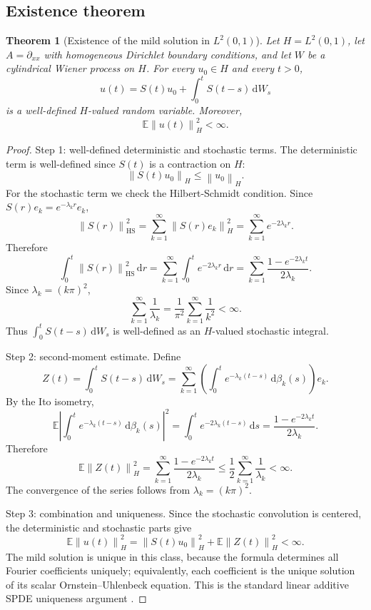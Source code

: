 \documentclass[11pt,a4paper]{article}
\newtheorem{theorem}{Theorem}[section]
\newcommand{\E}{\mathbb{E}}
\newcommand{\dd}{\,\mathrm{d}}
\newcommand{\HS}{\mathrm{HS}}
\newcommand{\norm}[1]{\left\lVert #1 \right\rVert}
\begin{document}
\subsection{Existence theorem}

\begin{theorem}[Existence of the mild solution in \(L^2(0,1)\)]
Let \(H=L^2(0,1)\), let \(A=\partial_{xx}\) with homogeneous Dirichlet boundary
conditions, and let \(W\) be a cylindrical Wiener process on \(H\). For every
\(u_0\in H\) and every \(t>0\),
\[
  u(t)=S(t)u_0+\int_0^t S(t-s)\dd W_s
\]
is a well-defined \(H\)-valued random variable. Moreover,
\[
  \E\norm{u(t)}_H^2<\infty.
\]
\end{theorem}

\begin{proof}
Step 1: well-defined deterministic and stochastic terms. The deterministic
term is well-defined since \(S(t)\) is a contraction on \(H\):
\[
  \norm{S(t)u_0}_H\le \norm{u_0}_H.
\]
For the stochastic term we check the Hilbert-Schmidt condition. Since
\(S(r)e_k=e^{-\lambda_k r}e_k\),
\[
  \norm{S(r)}_{\HS}^2
  =
  \sum_{k=1}^{\infty}\norm{S(r)e_k}_H^2
  =
  \sum_{k=1}^{\infty}e^{-2\lambda_k r}.
\]
Therefore
\[
  \int_0^t\norm{S(r)}_{\HS}^2\dd r
  =
  \sum_{k=1}^{\infty}\int_0^t e^{-2\lambda_k r}\dd r
  =
  \sum_{k=1}^{\infty}\frac{1-e^{-2\lambda_k t}}{2\lambda_k}.
\]
Since \(\lambda_k=(k\pi)^2\),
\[
  \sum_{k=1}^{\infty}\frac{1}{\lambda_k}
  =
  \frac{1}{\pi^2}\sum_{k=1}^{\infty}\frac{1}{k^2}
  <\infty.
\]
Thus \(\int_0^t S(t-s)\dd W_s\) is well-defined as an \(H\)-valued stochastic
integral.

Step 2: second-moment estimate. Define
\[
  Z(t)=\int_0^t S(t-s)\dd W_s
  =
  \sum_{k=1}^{\infty}
  \left(
    \int_0^t e^{-\lambda_k(t-s)}\dd\beta_k(s)
  \right)e_k.
\]
By the Ito isometry,
\[
  \E\left|
    \int_0^t e^{-\lambda_k(t-s)}\dd\beta_k(s)
  \right|^2
  =
  \int_0^t e^{-2\lambda_k(t-s)}\dd s
  =
  \frac{1-e^{-2\lambda_k t}}{2\lambda_k}.
\]
Therefore
\[
  \E\norm{Z(t)}_H^2
  =
  \sum_{k=1}^{\infty}
  \frac{1-e^{-2\lambda_k t}}{2\lambda_k}
  \le
  \frac12\sum_{k=1}^{\infty}\frac{1}{\lambda_k}
  <\infty.
\]
The convergence of the series follows from \(\lambda_k=(k\pi)^2\).

Step 3: combination and uniqueness. Since the stochastic convolution is
centered, the deterministic and stochastic parts give
\[
  \E\norm{u(t)}_H^2
  =
  \norm{S(t)u_0}_H^2
  +
  \E\norm{Z(t)}_H^2
  <\infty.
\]
The mild solution is unique in this class, because the formula determines all
Fourier coefficients uniquely; equivalently, each coefficient is the unique
solution of its scalar Ornstein--Uhlenbeck equation. This is the standard
linear additive SPDE uniqueness argument \cite{delSarto2025,daPratoZabczyk}.
\end{proof}
\end{document}
